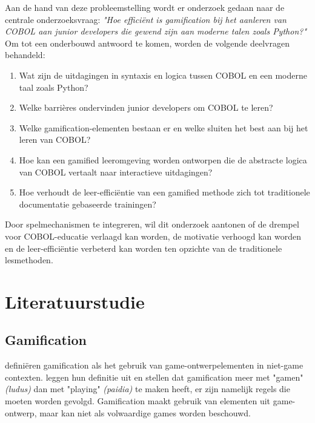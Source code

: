 Aan de hand van deze probleemstelling wordt er onderzoek gedaan naar de centrale onderzoeksvraag: 
\textit{"Hoe efficiënt is gamification bij het aanleren van COBOL aan junior developers die gewend zijn aan moderne talen zoals Python?"}\break
Om tot een onderbouwd antwoord te komen, worden de volgende deelvragen behandeld:

\begin{enumerate}
    \item Wat zijn de uitdagingen in syntaxis en logica tussen COBOL en een moderne taal zoals Python?
    \item Welke barrières ondervinden junior developers om COBOL te leren?
    \item Welke gamification-elementen bestaan er en welke sluiten het best aan bij het leren van COBOL?
    \item Hoe kan een gamified leeromgeving worden ontworpen die de abstracte logica van COBOL vertaalt naar interactieve uitdagingen?
    \item Hoe verhoudt de leer-efficiëntie van een gamified methode zich tot traditionele documentatie gebaseerde trainingen?
\end{enumerate}

Door spelmechanismen te integreren, wil dit onderzoek aantonen of de drempel voor COBOL-educatie verlaagd kan worden, 
de motivatie verhoogd kan worden en de leer-efficiëntie verbeterd kan worden ten opzichte van de traditionele lesmethoden.


\section{Literatuurstudie}%
\label{sec:literatuurstudie}

\subsection{Gamification}

\textcite{Deterding2011} definiëren gamification als het gebruik van game-\allowbreak ontwerpelementen in niet-\allowbreak game contexten. 
\textcite{Deterding2011} leggen hun definitie uit en stellen dat gamification meer met "gamen" \textit{(ludus)} dan met "playing" \textit{(paidia)} te maken heeft, er zijn namelijk regels die moeten worden gevolgd.
Gamification  maakt  gebruik  van  elementen  uit  game-ontwerp,  maar  kan  niet  als  volwaardige  games  worden  beschouwd.

